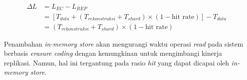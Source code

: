 \begin{enumerate}
  \begin{align}
    \Delta L &= L_{EC} - L_{REP} \\
    &= \left[T_{data} + (T_{rekonstruksi} + T_{shard}) \times (1 - \text{hit rate})\right] - T_{data} \\
    &= (T_{rekonstruksi} + T_{shard}) \times (1 - \text{hit rate})
    \label{eq:ec-read-latency-diff-inmemory}
  \end{align}

  Penambahan \textit{in-memory store} akan mengurangi waktu operasi \textit{read} pada sistem berbasis \textit{erasure coding} dengan kemungkinan untuk mengimbangi kinerja replikasi. Namun, hal ini tergantung pada rasio \textit{hit} yang dapat dicapai oleh \textit{in-memory store}.
  


\end{enumerate}